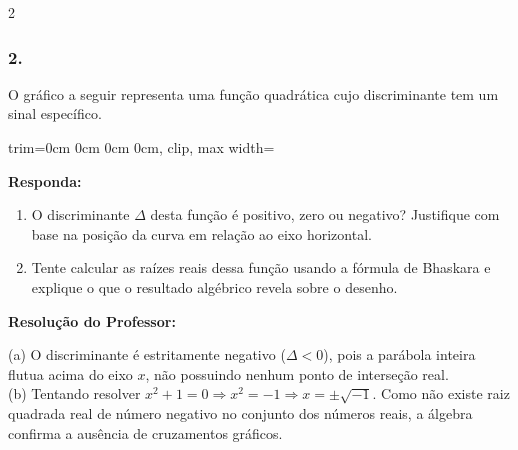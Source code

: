 \begin{multicols*}{2}
\subsubsection*{2.} O gráfico a seguir representa uma função quadrática cujo discriminante tem um sinal específico.

\begin{center}
\begin{adjustbox}{trim=0cm 0cm 0cm 0cm, clip, max width=\larguraTikz}
\end{adjustbox}
\end{center}

\begin{boxresponda}
\textbf{Responda:} 
\begin{enumerate}[label=\alph*), itemsep=\espacoAlt]
\item O discriminante $\Delta$ desta função é positivo, zero ou negativo? Justifique com base na posição da curva em relação ao eixo horizontal.
\item Tente calcular as raízes reais dessa função usando a fórmula de Bhaskara e explique o que o resultado algébrico revela sobre o desenho.
\end{enumerate}
\end{boxresponda}

\ifgabarito
    \begin{tcolorbox}[colback=CorTitUm!5, colframe=CorTitUm, boxrule=1pt, arc=4pt, left=6pt, right=6pt, top=6pt, bottom=6pt]
    \small\textbf{\textcolor{CorTitUm}{Resolução do Professor:}}\par\vspace{0.1cm}
    \color{CinzaEscuro}
    (a) O discriminante é estritamente negativo ($\Delta < 0$), pois a parábola inteira flutua acima do eixo $x$, não possuindo nenhum ponto de interseção real. \\
    (b) Tentando resolver $x^2 + 1 = 0 \Rightarrow x^2 = -1 \Rightarrow x = \pm\sqrt{-1}$. Como não existe raiz quadrada real de número negativo no conjunto dos números reais, a álgebra confirma a ausência de cruzamentos gráficos.
    \end{tcolorbox}
\fi


\end{multicols*}
